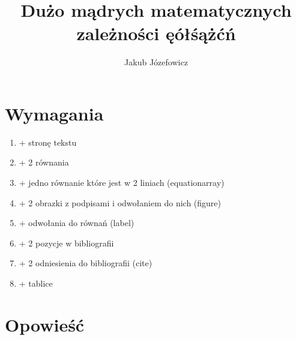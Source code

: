 \documentclass[11pt]{article}
\title{Dużo mądrych matematycznych zależności ęółśążćń}
\author{Jakub Józefowicz}
\begin{document}
\maketitle

\newpage
\part{Wymagania}
\begin{enumerate}
\item + stronę tekstu
\item + 2 równania
\item + jedno równanie które jest w 2 liniach (equationarray)
\item + 2 obrazki z podpisami i odwołaniem do nich (figure) 
\item + odwołania do równań (label)
\item + 2 pozycje w bibliografii
\item + 2 odniesienia do bibliografii (cite)
\item + tablice 
\end{enumerate}

\newpage
\part{Opowieść}
\end{document}
